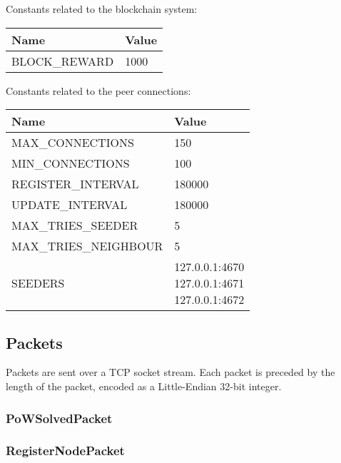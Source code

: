 \documentclass[../documentation.tex]{subfiles}
\begin{document}
Constants related to the blockchain system:

\bgroup{}
\def\arraystretch{1.25}
\begin{tabular}{|l|l|}
    \hline
    \textbf{Name} & \textbf{Value}
    \\ \hline
    BLOCK\_REWARD & 1000
    \\ \hline
\end{tabular}
\egroup{}

Constants related to the peer connections:

\bgroup{}
\def\arraystretch{1.25}
\begin{tabular}{|l|l|}
    \hline
    \textbf{Name} & \textbf{Value}
    \\ \hline
    MAX\_CONNECTIONS & 150
    \\ \hline
    MIN\_CONNECTIONS & 100
    \\ \hline
    REGISTER\_INTERVAL & 180000
    \\ \hline
    UPDATE\_INTERVAL & 180000
    \\ \hline
    MAX\_TRIES\_SEEDER & 5
    \\ \hline
    MAX\_TRIES\_NEIGHBOUR & 5
    \\ \hline
    SEEDERS & \makecell[t] {
        127.0.0.1:4670 \\
        127.0.0.1:4671 \\
        127.0.0.1:4672
    }
    \\ \hline
\end{tabular}
\egroup{}

\hypertarget{packets}{}
\subsection{Packets}

Packets are sent over a TCP socket stream.
Each packet is preceded by the length of the packet,
encoded as a Little-Endian 32-bit integer.

\subsubsection{PoWSolvedPacket}


\subsubsection{RegisterNodePacket}

\end{document}
